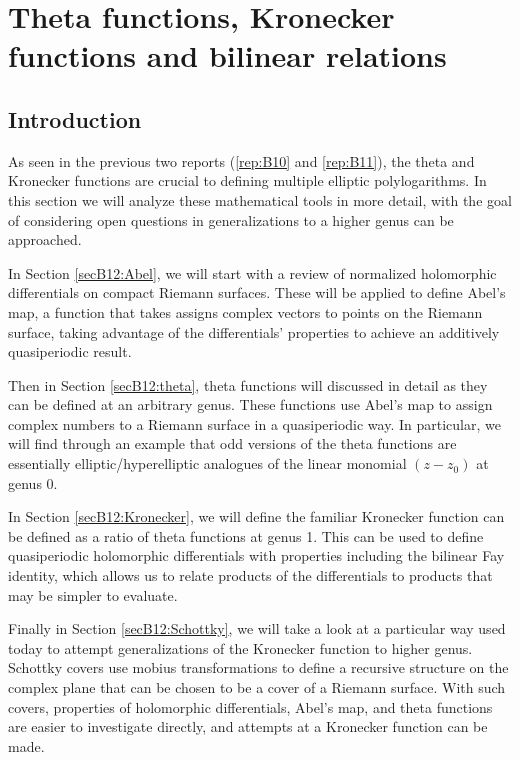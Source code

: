 

\newcommand{\bolde}[0]{\mathbf{e}}

\chapter{Theta functions, Kronecker functions and bilinear relations}
\label{rep:B12}

\section{Introduction}

As seen in the previous two reports (\ref{rep:B10} and \ref{rep:B11}), the theta and Kronecker functions are crucial to defining multiple elliptic polylogarithms. In this section we will analyze these mathematical tools in more detail, with the goal of considering open questions in generalizations to a higher genus can be approached.

In Section \ref{secB12:Abel}, we will start with a review of normalized holomorphic differentials on compact Riemann surfaces. These will be applied to define Abel's map, a function that takes assigns complex vectors to points on the Riemann surface, taking advantage of the differentials' properties to achieve an additively quasiperiodic result.

Then in Section \ref{secB12:theta}, theta functions will discussed in detail as they can be defined at an arbitrary genus. These functions use Abel's map to assign complex numbers to a Riemann surface in a quasiperiodic way. In particular, we will find through an example that odd versions of the theta functions are essentially elliptic/hyperelliptic analogues of the linear monomial $(z-z_0)$ at genus 0.

In Section \ref{secB12:Kronecker}, we will define the familiar Kronecker function can be defined as a ratio of theta functions at genus 1. This can be used to define quasiperiodic holomorphic differentials with properties including the bilinear Fay identity, which allows us to relate products of the differentials to products that may be simpler to evaluate.

Finally in Section \ref{secB12:Schottky}, we will take a look at a particular way used today to attempt generalizations of the Kronecker function to higher genus. Schottky covers use mobius transformations to define a recursive structure on the complex plane that can be chosen to be a cover of a Riemann surface. With such covers, properties of holomorphic differentials, Abel's map, and theta functions are easier to investigate directly, and attempts at a Kronecker function can be made.

